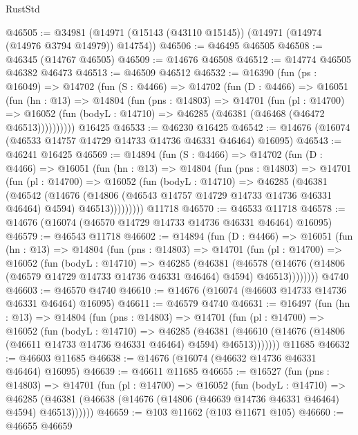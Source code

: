 \begin{lexlean}{RustStd}
\begin{coremodule}
@46505 := @34981 (@14971 (@15143 (@43110 @15145)) (@14971 (@14974 (@14976 @3794 @14979)) @14754))
@46506 := @46495 @46505
@46508 := @46345 (@14767 @46505)
@46509 := @14676 @46508
@46512 := @14774 @46505 @46382 @46473
@46513 := @46509 @46512
@46532 := @16390
    (fun (ps : @16049) =>
    @14702
      (fun (S : @4466) =>
      @14702
        (fun (D : @4466) =>
        @16051
          (fun (hn : @13) =>
          @14804
            (fun (pns : @14803) =>
            @14701
              (fun (pl : @14700) =>
              @16052 (fun (bodyL : @14710) => @46285 (@46381 (@46468 (@46472 @46513))))))))))
    @16425
@46533 := @46230 @16425
@46542 := @14676 (@16074 (@46533 @14757 @14729 @14733 @14736 @46331 @46464) @16095)
@46543 := @46241 @16425
@46569 := @14894
    (fun (S : @4466) =>
    @14702
      (fun (D : @4466) =>
      @16051
        (fun (hn : @13) =>
        @14804
          (fun (pns : @14803) =>
          @14701
            (fun (pl : @14700) =>
            @16052
              (fun (bodyL : @14710) =>
              @46285
                (@46381
                  (@46542
                    (@14676
                      (@14806 (@46543 @14757 @14729 @14733 @14736 @46331 @46464) @4594)
                      @46513)))))))))
    @11718
@46570 := @46533 @11718
@46578 := @14676 (@16074 (@46570 @14729 @14733 @14736 @46331 @46464) @16095)
@46579 := @46543 @11718
@46602 := @14894
    (fun (D : @4466) =>
    @16051
      (fun (hn : @13) =>
      @14804
        (fun (pns : @14803) =>
        @14701
          (fun (pl : @14700) =>
          @16052
            (fun (bodyL : @14710) =>
            @46285
              (@46381
                (@46578
                  (@14676 (@14806 (@46579 @14729 @14733 @14736 @46331 @46464) @4594) @46513))))))))
    @4740
@46603 := @46570 @4740
@46610 := @14676 (@16074 (@46603 @14733 @14736 @46331 @46464) @16095)
@46611 := @46579 @4740
@46631 := @16497
    (fun (hn : @13) =>
    @14804
      (fun (pns : @14803) =>
      @14701
        (fun (pl : @14700) =>
        @16052
          (fun (bodyL : @14710) =>
          @46285
            (@46381
              (@46610 (@14676 (@14806 (@46611 @14733 @14736 @46331 @46464) @4594) @46513)))))))
    @11685
@46632 := @46603 @11685
@46638 := @14676 (@16074 (@46632 @14736 @46331 @46464) @16095)
@46639 := @46611 @11685
@46655 := @16527
    (fun (pns : @14803) =>
    @14701
      (fun (pl : @14700) =>
      @16052
        (fun (bodyL : @14710) =>
        @46285 (@46381 (@46638 (@14676 (@14806 (@46639 @14736 @46331 @46464) @4594) @46513))))))
@46659 := @103 @11662 (@103 @11671 @105)
@46660 := @46655 @46659

\end{coremodule}
\end{lexlean}
